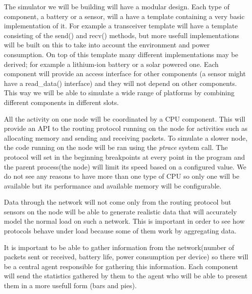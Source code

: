 \label{subsec:architecture}

The simulator we will be building will have a modular design. Each type
of component, a battery or a sensor, will a have a template containing a
very basic implementation of it. For example a transceiver template will
have a template consisting of the send() and recv() methods, but more
usefull implementations will be built on this to take into account the
environment and power consumption. On top of this template many different
implementations may be derived; for example a lithium-ion battery or a solar
powered one. Each component will provide an access interface for other components
(a sensor might have a read_data() interface) and they will not depend on other 
components. This way we will be able to simulate a wide range of platforms by
combining different components in different slots.

All the activity on one node will be coordinated by a CPU component. This will provide
an API to the routing protocol running on the node for activities such as allocating memory 
and sending and receiving packets. To simulate a slower node, the code running on the 
node will be ran using the \textit{ptrace} system call. The protocol will set in the beginning
breakpoints at every point in the program and the parent process(the node) will limit
its speed based on a configured value. We do not see any reasons to have more than one
type of CPU so only one will be available but its performance and available memory
will be configurable.

Data through the network will not come only from the routing protocol but sensors on the 
node will be able to generate realistic data that will accurately model the normal load
on such a network. This is important in order to see how protocols behave under load 
because some of them work by aggregating data.

It is important to be able to gather information from the network(number of packets sent
or received, battery life, power consumption per device) so there will be a central agent
responsible for gathering this information. Each component will send the statistics gathered
by them to the agent who will be able to present them in a more usefull form (bars and pies).
